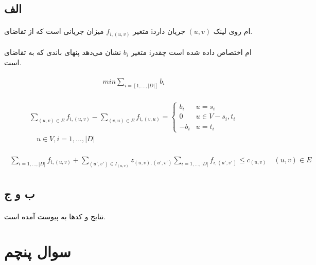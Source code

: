 \documentclass[paper=a4, fontsize=11pt]{article}
\numberwithin{equation}{section} %
\numberwithin{figure}{section} %
\numberwithin{table}{section} %
\begin{document}
\subsection{الف}
\paragraph{}
متغیر $f_{i,(u,v)}$ میزان جریانی است که از تقاضای iام روی لینک
$(u,v)$ جریان دارد.

\paragraph{}
متغیر $b_i$ نشان می‌دهد پنهای باندی که به تقاضای iام
اختصاص داده شده است چقدر است.

\begin{align}
\begin{split}
	min \sum_{i = [1, ..., |D|]} b_i
\end{split}
\end{align}

\begin{align}
\begin{split}
	\sum_{(u,v) \in E} f_{i,(u,v)} - \sum_{(v,u) \in E} f_{i,(v,u)} = 
	\left \{
		\begin{array}{cc}
			b_i & u = s_i\\
			0 & u \in V - {s_i, t_i}\\
			-b_i & u = t_i
		\end{array}
	\right.
	\\
	\quad u \in V, i = {1, ..., |D|}
\end{split}
\end{align}

\begin{align}
\begin{split}
	\sum_{i = {1, ..., |D|}} f_{i,(u,v)} + \sum_{(u',v') \in I_{(u,v)}} z_{(u,v),(u',v')} \sum_{i = {1, ..., |D|}} f_{i,(u',v')} \le c_{(u,v)}
	\quad (u,v) \in E
\end{split}
\end{align}

\subsection{ب و ج}
\paragraph{}
نتایج و کدها به پیوست آمده است.

\section{سوال پنچم}
\end{document}
